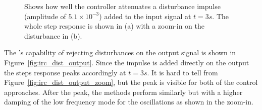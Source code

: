 \begin{figure}[h!]
  \centering %
  \qquad
  \caption{\label{fig:irc_dist_input} Shows how well the controller attenuates a disturbance impulse (amplitude of $5.1 \times 10^{-3}$) added to the input signal at $t=3s$. The whole step response is shown in (a) with a zoom-in on the disturbance in (b).}
\end{figure}

The \abbrIRC's capability of rejecting disturbances on the output signal is shown in Figure~\ref{fig:irc_dist_output}. Since the impulse is added directly on the output the steps response peaks accordingly at $t=3s$. It is hard to tell from Figure~\ref{fig:irc_dist_output_zoom}, but the peak is visible for both of the control approaches. After the peak, the methods perform similarly but with a higher damping of the low frequency mode for the \abbrIRC oscillations as shown in the zoom-in.

